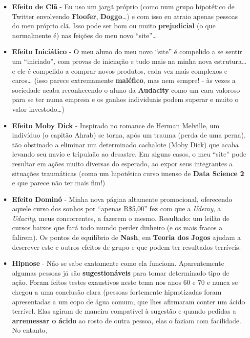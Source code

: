 \documentclass[11pt]{article}
\begin{document}
\begin{itemize}
\item
  \textbf{Efeito de Clã} - Eu uso um jargã próprio (como num grupo
  hipotético de Twitter envolvendo \textbf{Floofer},
  \textbf{Doggo}\ldots{}) e com isso eu atraio apenas pessoas do meu
  próprio clã. Isso pode ser bom ou muito \textbf{prejudicial} (o que
  normalmente é) nas feições do meu novo ``site''\ldots{}
\item
  \textbf{Efeito Iniciático} - O meu aluno do meu novo ``site'' é
  compelido a se sentir um ``iniciado'', com provas de iniciação e tudo
  mais na minha nova estrutura\ldots{} e ele é compelido a comprar novos
  produtos, cada vez mais complexos e caros\ldots{} (isso parece
  extremamente \textbf{maléfico}, mas nem sempre! - às vezes a sociedade
  acaba reconhecendo o aluno da \textbf{Audacity} como um cara valoroso
  para se ter numa empresa e os ganhos individuais podem superar e muito
  o valor investodo\ldots{})
\item
  \textbf{Efeito Moby Dick} - Inspirado no romance de Herman Melville,
  um indivíduo (o capitão Ahrab) se torna, após um trauma (perda de uma
  perna), tão obstinado a eliminar um determinado cachalote (Moby Dick)
  que acaba levando seu navio e tripulaão ao desastre. Em alguns casos,
  o meu ``site'' pode resultar em ações muito diversas do esperado, ao
  expor seus integrantes a situações traumáticas (como um hipotético
  curso imenso de \textbf{Data Science 2} e que parece não ter mais
  fim!)
\item
  \textbf{Efeito Dominó} - Minha nova página altamente promocional,
  oferecendo aquele curso dos sonhos por ``apenas R\$5,00'' fez com que
  a \emph{Udemy}, a \emph{Udacity}, meus concorrentes, a fazerem o
  mesmo. Resultado: um leilão de cursos baixos que fará todo mundo
  perder dinheiro (e os mais fracos a falirem). Os pontos de equilíbrio
  de \textbf{Nash}, em \textbf{Teoria dos Jogos} ajudam a descrever este
  e outros efeitos de grupo e que podem ter resultados terríveis.
\item
  \textbf{Hipnose} - Não se sabe exatamente como ela funciona.
  Aparentemente algumas pessoas já são \textbf{sugestionáveis} para
  tomar determinado tipo de ação. Foram feitos testes exaustivos neste
  tema nos anos 60 e 70 e nunca se chegou a uma conclusão clara (pessoas
  fortemente hipnotizadas foram apresentadas a um copo de água comum,
  que lhes afirmaram conter um ácido terrível. Elas agiram de maneira
  compatível à sugestão e quando pedidas a \textbf{arremessar o ácido}
  ao rosto de outra pessoa, elas o faziam com facilidade. No entanto,

\end{itemize}
\end{document}
